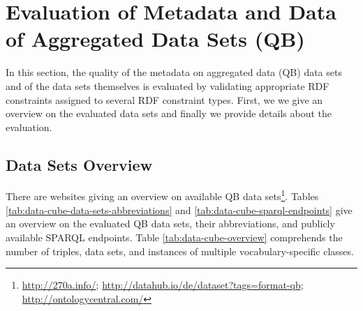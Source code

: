 \documentclass{llncs}
\begin{document}
\section{Evaluation of Metadata and Data of Aggregated Data Sets (QB)}

In this section, the quality of the metadata on aggregated data (QB) data sets and of the data sets themselves is evaluated by validating appropriate RDF constraints assigned to several RDF constraint types.
First, we we give an overview on the evaluated data sets and finally we provide details about the evaluation.

\subsection{Data Sets Overview}

There are websites giving an overview on available QB data sets\footnote{\url{http://270a.info/}; \url{http://datahub.io/de/dataset?tags=format-qb}; \url{http://ontologycentral.com/}}. 
Tables \ref{tab:data-cube-data-sets-abbreviations} and \ref{tab:data-cube-sparql-endpoints} give an overview on the evaluated QB data sets, their abbreviations, and publicly available SPARQL endpoints.
Table \ref{tab:data-cube-overview} comprehends the number of triples, data sets, and instances of multiple vocabulary-specific classes.
\end{document}
